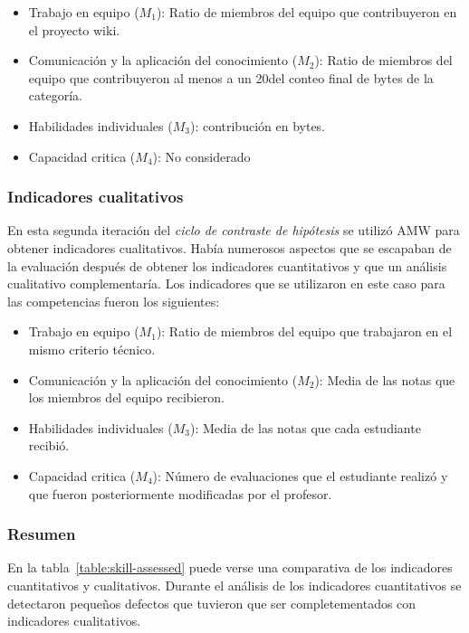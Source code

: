 \begin{itemize}
	\item Trabajo en equipo ($M_1$): Ratio de miembros del equipo que contribuyeron en el proyecto wiki.
	\item Comunicación y la aplicación del conocimiento ($M_2$): Ratio de miembros del equipo que contribuyeron al menos a un 20\percentage del conteo final de bytes de la categoría.
	\item Habilidades individuales ($M_3$): contribución en bytes.
	\item Capacidad critica ($M_4$): No considerado
\end{itemize}

\subsubsection{Indicadores cualitativos}

En esta segunda iteración del \emph{ciclo de contraste de hipótesis} se utilizó AMW para obtener indicadores cualitativos. Había numerosos aspectos que se escapaban de la evaluación después de obtener los indicadores cuantitativos y que un análisis cualitativo complementaría. Los indicadores que se utilizaron en este caso para las competencias fueron los siguientes:

\begin{itemize}
	\item Trabajo en equipo ($M_1$): Ratio de miembros del equipo que trabajaron en el mismo criterio técnico.
	\item Comunicación y la aplicación del conocimiento ($M_2$): Media de las notas que los miembros del equipo recibieron.
	\item Habilidades individuales ($M_3$): Media de las notas que cada estudiante recibió.
	\item Capacidad critica ($M_4$): Número de evaluaciones que el estudiante realizó y que fueron posteriormente modificadas por el profesor.
\end{itemize}

\subsubsection{Resumen}

En la tabla~\ref{table:skill-assessed} puede verse una comparativa de los indicadores cuantitativos y cualitativos. Durante el análisis de los indicadores cuantitativos se detectaron pequeños defectos que tuvieron que ser completementados con indicadores cualitativos. 

